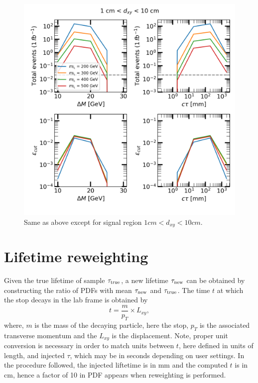 \documentclass[prd,reprint,nofootinbib,notitlepage,aps,tightenlines,amsmath,amssymb,showpacs,superscriptaddress]{revtex4-1}
\begin{document}
\begin{figure}[tb]
  \includegraphics[width=0.8\columnwidth]{./figures/1_dxy_10_full_grid.png}%
 \caption{Same as above except for signal region $1 cm < d_{xy} < 10 cm$. }
\label{fig:full_grid_dxy10}
\end{figure}

\section{Lifetime reweighting}
\label{sec:lt}
Given the true lifetime of sample $\tau_{\rm{true}}$, a new lifetime $\tau_{\rm{new}}$ can be obtained by constructing the ratio of PDFs with mean $\tau_{\rm{new}}$ and $\tau_{\rm{true}}$. The time $t$ at which the stop decays in the lab frame is obtained by 
\begin{equation}
    t = \frac{m}{p_T} \times L_{xy},
\end{equation}
where, $m$ is the mass of the decaying particle, here the stop, $p_T$ is the associated transverse momentum and the $L_{xy}$ is the displacement. Note, proper unit conversion is necessary in order to match units between $t$, here defined in units of length, and injected $\tau$, which may be in seconds depending on user settings. In the procedure followed, the injected liftetime is in mm and the computed $t$ is in cm, hence a factor of 10 in PDF appears when reweighting is performed. 
\end{document}
